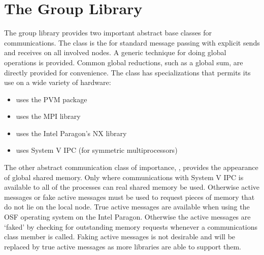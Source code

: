 
\chapter{The Group Library}

The group library provides two important abstract base
classes for communications.  The  class
is the for standard message passing with explicit sends and
receives on all involved nodes.  A generic technique for
doing global operations is provided.  Common global
reductions, such as a global sum, are directly provided for
convenience.  The  class has
specializations that permits its use on a wide variety of
hardware:

\begin{itemize}
\item {} uses the PVM package
\item {} uses the MPI library
\item {} uses the Intel Paragon's NX library
\item {} uses System V IPC (for
      symmetric multiprocessors)
\end{itemize}

The other abstract communication class of importance,
, provides the appearance of global
shared memory.  Only where communications with System V IPC
is available to all of the processes can real shared memory
be used.  Otherwise active messages or fake active messages
must be used to request pieces of memory that do not lie on
the local node.  True active messages are available when
using the OSF operating system on the Intel Paragon.
Otherwise the active messages are `faked' by checking for
outstanding memory requests whenever a communications class
member is called.  Faking active messages is not desirable
and will be replaced by true active messages as more
libraries are able to support them.














